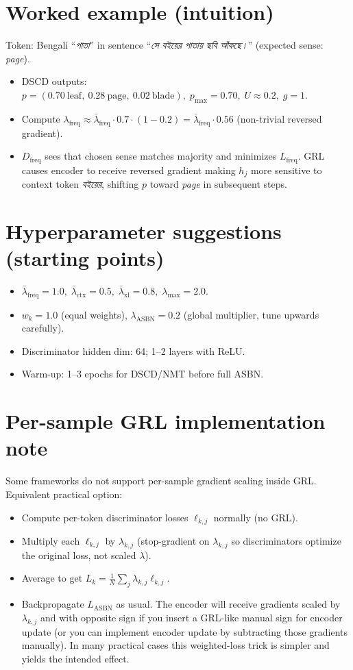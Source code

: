 \documentclass[11pt]{article}
\begin{document}
\section{Worked example (intuition)}
Token: Bengali ``\textit{পাতা}'' in sentence ``\textit{সে বইয়ের পাতায় ছবি আঁকছে।}'' (expected sense: \emph{page}).
\begin{itemize}
  \item DSCD outputs: $p=(0.70\ \text{leaf},\ 0.28\ \text{page},\ 0.02\ \text{blade}),\; p_{\max}=0.70,\; U\approx 0.2,\; g=1$.
  \item Compute $\lambda_{\text{freq}}\!\approx\!\bar{\lambda}_{\text{freq}}\cdot0.7\cdot(1-0.2)\!=\!\bar{\lambda}_{\text{freq}}\cdot0.56$ (non-trivial reversed gradient).
  \item $D_{\text{freq}}$ sees that chosen sense matches majority and minimizes $L_{\text{freq}}$. GRL causes encoder to receive reversed gradient making $h_j$ more sensitive to context token \textit{বইয়ের}, shifting $p$ toward \emph{page} in subsequent steps.
\end{itemize}

\section{Hyperparameter suggestions (starting points)}
\begin{itemize}
  \item $\bar{\lambda}_{\text{freq}}=1.0,\; \bar{\lambda}_{\text{ctx}}=0.5,\; \bar{\lambda}_{\text{xl}}=0.8,\; \lambda_{\max}=2.0$.
  \item $w_k=1.0$ (equal weights), $\lambda_{\text{ASBN}}=0.2$ (global multiplier, tune upwards carefully).
  \item Discriminator hidden dim: 64; 1--2 layers with ReLU.
  \item Warm-up: 1--3 epochs for DSCD/NMT before full ASBN.
\end{itemize}

\section*{Per-sample GRL implementation note}
Some frameworks do not support per-sample gradient scaling inside GRL. Equivalent practical option:
\begin{itemize}
  \item Compute per-token discriminator losses $\ell_{k,j}$ normally (no GRL).
  \item Multiply each $\ell_{k,j}$ by $\lambda_{k,j}$ (stop-gradient on $\lambda_{k,j}$ so discriminators optimize the original loss, not scaled $\lambda$).
  \item Average to get $L_k = \frac{1}{N}\sum_j \lambda_{k,j}\ell_{k,j}$.
  \item Backpropagate $L_{\text{ASBN}}$ as usual. The encoder will receive gradients scaled by $\lambda_{k,j}$ and with opposite sign if you insert a GRL-like manual sign for encoder update (or you can implement encoder update by subtracting those gradients manually). In many practical cases this weighted-loss trick is simpler and yields the intended effect.
\end{itemize}
\end{document}
